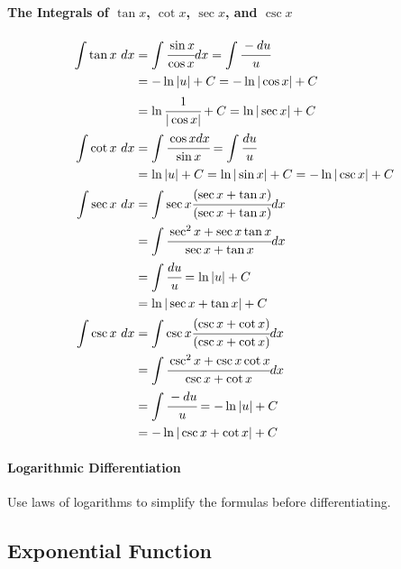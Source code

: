 \documentclass{article}
\begin{document}
            \paragraph{The Integrals of $\tan x$, $\cot x$, $\sec x$, and $\csc x$}
                \begin{equation}
                    \begin{aligned}
                        \int \tan x\ dx&=\int \cfrac{\sin x}{\cos x} dx=\int \cfrac{-du}{u}\\
                        &=-\ln |u| +C=-\ln |\cos x| +C\\
                        &=\ln \cfrac{1}{|\cos x|} +C=\ln |\sec x|+C\\
                        \int \cot x\ dx&=\int \cfrac{\cos x dx}{\sin x}=\int\cfrac{du}{u}\\
                        &=\ln |u|+C=\ln |\sin x|+C=-\ln |\csc x|+C\\
                        \int \sec x\ dx&=\int \sec x \cfrac{(\sec x+\tan x)}{(\sec x+\tan x)} dx\\
                        &=\int \cfrac{\sec ^2 x+\sec x\tan x}{\sec x+\tan x}dx\\
                        &=\int \cfrac{du}{u}=\ln |u|+C\\
                        &=\ln |\sec x+\tan x|+C\\
                        \int \csc x\ dx&=\int \csc x\cfrac{(\csc x+\cot x)}{(\csc x+\cot x)} dx\\
                        &=\int\cfrac{\csc^2 x+\csc x\cot x}{\csc x+\cot x}dx\\
                        &=\int \cfrac{-du}{u}=-\ln |u|+C\\
                        &=-\ln |\csc x+\cot x|+C\\
                    \end{aligned}
                \end{equation}
            \paragraph{Logarithmic Differentiation}
            Use laws of logarithms to simplify the formulas before differentiating.
        \subsection{Exponential Function}
\end{document}

